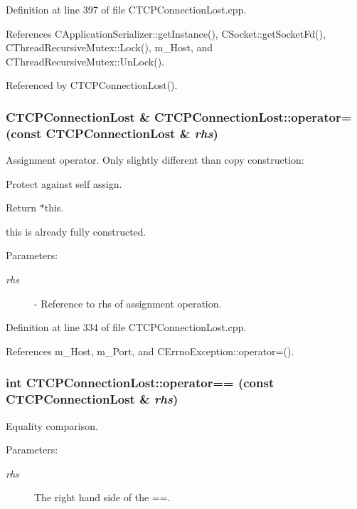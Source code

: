 Definition at line 397 of file CTCPConnection\-Lost.cpp.

References CApplication\-Serializer::get\-Instance(), CSocket::get\-Socket\-Fd(), CThread\-Recursive\-Mutex::Lock(), m\_\-Host, and CThread\-Recursive\-Mutex::Un\-Lock().

Referenced by CTCPConnection\-Lost().
\subsubsection{\setlength{\rightskip}{0pt plus 5cm}CTCPConnection\-Lost \& CTCPConnection\-Lost::operator= (const CTCPConnection\-Lost \& {\em rhs})}\label{classCTCPConnectionLost_a3}


Assignment operator. Only slightly different than copy construction:\begin{CompactItemize}
\item 
Protect against self assign.\item 
Return $\ast$this.\item 
this is already fully constructed.\end{CompactItemize}
\begin{Desc}
\item[Parameters: ]\par
\begin{description}
\item[{\em 
rhs}]- Reference to rhs of assignment operation. \end{description}
\end{Desc}


Definition at line 334 of file CTCPConnection\-Lost.cpp.

References m\_\-Host, m\_\-Port, and CErrno\-Exception::operator=().
\subsubsection{\setlength{\rightskip}{0pt plus 5cm}int CTCPConnection\-Lost::operator== (const CTCPConnection\-Lost \& {\em rhs})}\label{classCTCPConnectionLost_a4}


Equality comparison.\begin{Desc}
\item[Parameters: ]\par
\begin{description}
\item[{\em 
rhs}]The right hand side of the ==. \end{description}
\end{Desc}


